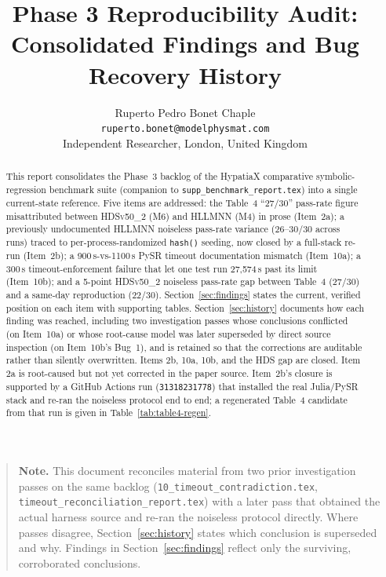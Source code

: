 \documentclass[twoside,11pt]{article}
\newcommand{\HSL}{\textsc{HLLMNN}}
\newcommand{\HDS}{\textsc{HDSv50\_2}}
\begin{document}
\title{Phase 3 Reproducibility Audit:\\[4pt]
  Consolidated Findings and Bug Recovery History}
\author{Ruperto Pedro Bonet Chaple\\
  \texttt{ruperto.bonet@modelphysmat.com}\\
  Independent Researcher, London, United Kingdom
}
\editor{}
\maketitle

\begin{abstract}
This report consolidates the Phase~3 backlog of the HypatiaX comparative
symbolic-regression benchmark suite (companion to
\texttt{supp\_benchmark\_report.tex}) into a single current-state
reference. Five items are addressed: the Table~4 ``27/30'' pass-rate
figure misattributed between \HDS{} (M6) and \HSL{} (M4) in prose
(Item~2a); a previously undocumented \HSL{} noiseless pass-rate variance
(26--30/30 across runs) traced to per-process-randomized \texttt{hash()}
seeding, now closed by a full-stack re-run (Item~2b); a 900\,s-vs-1100\,s
PySR timeout documentation mismatch (Item~10a); a 300\,s
timeout-enforcement failure that let one test run 27{,}574\,s past its
limit (Item~10b); and a 5-point \HDS{} noiseless pass-rate gap between
Table~4 (27/30) and a same-day reproduction (22/30). Section~\ref{sec:findings}
states the current, verified position on each item with supporting tables.
Section~\ref{sec:history} documents how each finding was reached,
including two investigation passes whose conclusions conflicted (on
Item~10a) or whose root-cause model was later superseded by direct
source inspection (on Item~10b's Bug~1), and is retained so that the
corrections are auditable rather than silently overwritten. Items 2b,
10a, 10b, and the HDS gap are closed. Item 2a is root-caused but not yet
corrected in the paper source. Item~2b's closure is supported by a
GitHub Actions run (\texttt{31318231778}) that installed the real
Julia/PySR stack and re-ran the noiseless protocol end to end; a
regenerated Table~4 candidate from that run is given in
Table~\ref{tab:table4-regen}.
\end{abstract}

\begin{quote}\small
\textbf{Note.} This document reconciles material from two prior
investigation passes on the same backlog
(\texttt{10\_timeout\_contradiction.tex},
\texttt{timeout\_reconciliation\_report.tex}) with a later pass that
obtained the actual harness source and re-ran the noiseless protocol
directly. Where passes disagree, Section~\ref{sec:history} states which
conclusion is superseded and why. Findings in Section~\ref{sec:findings}
reflect only the surviving, corroborated conclusions.
\end{quote}
\end{document}
